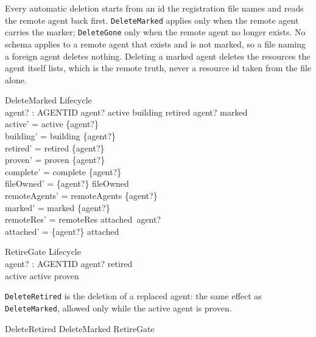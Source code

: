 \documentclass[a4paper,10pt,fleqn]{article}
\begin{document}
Every automatic deletion starts from an id the registration file names and
reads the remote agent back first. \texttt{DeleteMarked} applies only when
the remote agent carries the marker; \texttt{DeleteGone} only when the
remote agent no longer exists. No schema applies to a remote agent that
exists and is not marked, so a file naming a foreign agent deletes nothing.
Deleting a marked agent deletes the resources the agent itself lists, which
is the remote truth, never a resource id taken from the file alone.

\begin{schema}{DeleteMarked}
  \Delta Lifecycle \\
  agent? : AGENTID
\where
  agent? \in active \cup building \cup retired \land agent? \in marked \\
  active' = active \setminus \{agent?\} \\
  building' = building \setminus \{agent?\} \\
  retired' = retired \setminus \{agent?\} \\
  proven' = proven \setminus \{agent?\} \\
  complete' = complete \setminus \{agent?\} \\
  fileOwned' = \{agent?\} \ndres fileOwned \\
  remoteAgents' = remoteAgents \setminus \{agent?\} \\
  marked' = marked \setminus \{agent?\} \\
  remoteRes' = remoteRes \setminus attached~agent? \\
  attached' = \{agent?\} \ndres attached
\end{schema}

\begin{schema}{RetireGate}
  Lifecycle \\
  agent? : AGENTID
\where
  agent? \in retired \\
  active \neq \emptyset \land active \subseteq proven
\end{schema}

\texttt{DeleteRetired} is the deletion of a replaced agent: the same effect
as \texttt{DeleteMarked}, allowed only while the active agent is proven.

\begin{zed}
  DeleteRetired  DeleteMarked \land RetireGate
\end{zed}
\end{document}
